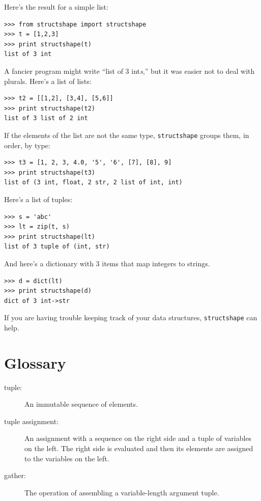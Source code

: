 \documentclass[10pt]{book}
\begin{document}
\begin{CJK}{UTF8}{gbsn}
Here's the result for a simple list:

\begin{verbatim}
>>> from structshape import structshape
>>> t = [1,2,3]
>>> print structshape(t)
list of 3 int
\end{verbatim}
%
A fancier program might write ``list of 3 int{\em s},'' but it
was easier not to deal with plurals.  Here's a list of lists:

\begin{verbatim}
>>> t2 = [[1,2], [3,4], [5,6]]
>>> print structshape(t2)
list of 3 list of 2 int
\end{verbatim}
%
If the elements of the list are not the same type,
{\tt structshape} groups them, in order, by type:

\begin{verbatim}
>>> t3 = [1, 2, 3, 4.0, '5', '6', [7], [8], 9]
>>> print structshape(t3)
list of (3 int, float, 2 str, 2 list of int, int)
\end{verbatim}
%
Here's a list of tuples:

\begin{verbatim}
>>> s = 'abc'
>>> lt = zip(t, s)
>>> print structshape(lt)
list of 3 tuple of (int, str)
\end{verbatim}
%
And here's a dictionary with 3 items that map integers to strings.

\begin{verbatim}
>>> d = dict(lt) 
>>> print structshape(d)
dict of 3 int->str
\end{verbatim}
%
If you are having trouble keeping track of your data structures,
{\tt structshape} can help.


\section{Glossary}

\begin{description}

\item[tuple:] An immutable sequence of elements.

\item[tuple assignment:] An assignment with a sequence on the
right side and a tuple of variables on the left.  The right
side is evaluated and then its elements are assigned to the
variables on the left.

\item[gather:] The operation of assembling a variable-length
argument tuple.


\end{description}
\end{CJK}
\end{document}
